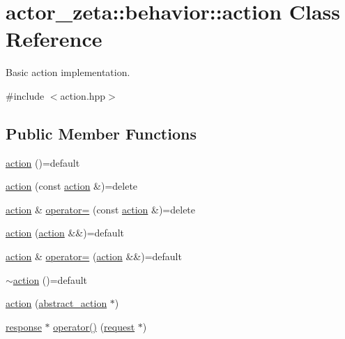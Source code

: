 \hypertarget{classactor__zeta_1_1behavior_1_1action}{}\section{actor\+\_\+zeta\+:\+:behavior\+:\+:action Class Reference}
\label{classactor__zeta_1_1behavior_1_1action}


Basic action implementation.  




{\ttfamily \#include $<$action.\+hpp$>$}

\subsection*{Public Member Functions}
\begin{DoxyCompactItemize}
\item 
\hyperlink{classactor__zeta_1_1behavior_1_1action_ae51e1d01deb04289074554b63a58173c}{action} ()=default
\item 
\hyperlink{classactor__zeta_1_1behavior_1_1action_a5aee8f55bd72c023101cfdc15743f9a3}{action} (const \hyperlink{classactor__zeta_1_1behavior_1_1action}{action} \&)=delete
\item 
\hyperlink{classactor__zeta_1_1behavior_1_1action}{action} \& \hyperlink{classactor__zeta_1_1behavior_1_1action_aa9055a54598dce71608fb023cfd4c37a}{operator=} (const \hyperlink{classactor__zeta_1_1behavior_1_1action}{action} \&)=delete
\item 
\hyperlink{classactor__zeta_1_1behavior_1_1action_a08d5d3dbb99797ed51ec40a1c9c2331f}{action} (\hyperlink{classactor__zeta_1_1behavior_1_1action}{action} \&\&)=default
\item 
\hyperlink{classactor__zeta_1_1behavior_1_1action}{action} \& \hyperlink{classactor__zeta_1_1behavior_1_1action_a32a15f7c6e38ffa311303dc6ff2d8bc2}{operator=} (\hyperlink{classactor__zeta_1_1behavior_1_1action}{action} \&\&)=default
\item 
\hyperlink{classactor__zeta_1_1behavior_1_1action_aca4d1f16a134e04a5812f3d44e17aa9c}{$\sim$action} ()=default
\item 
\hyperlink{classactor__zeta_1_1behavior_1_1action_a154dc8a6ec5b329fbc13df04dbc9df1b}{action} (\hyperlink{classactor__zeta_1_1behavior_1_1abstract__action}{abstract\+\_\+action} $\ast$)
\item 
\hyperlink{classactor__zeta_1_1behavior_1_1response}{response} $\ast$ \hyperlink{classactor__zeta_1_1behavior_1_1action_a5d46cfac3fb311555544971809d1c60c}{operator()} (\hyperlink{classactor__zeta_1_1behavior_1_1request}{request} $\ast$)
\end{DoxyCompactItemize}


